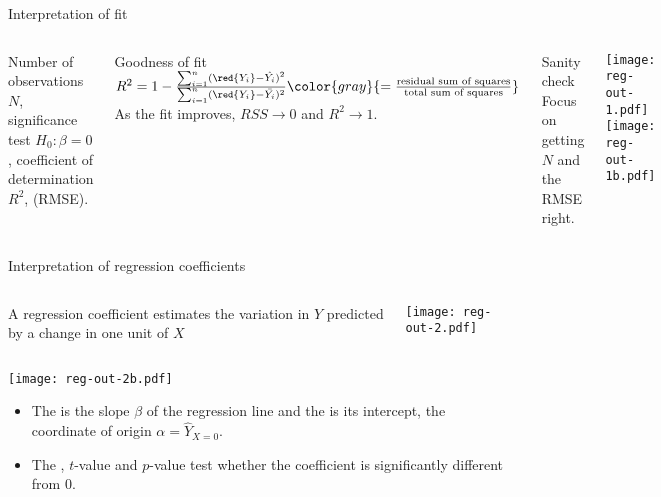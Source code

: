 \documentclass[t]{beamer}
\begin{document}
	\begin{frame}[t]{Interpretation of fit}

	\begin{columns}[T]


	Number of observations $N$, significance test $H_0: \beta = 0$, coefficient of determination $R^2$,  (RMSE).\\[1em]

	\begin{block}{Goodness of fit}\vspace{.5em}
		$R^2 = 1 - \frac{\sum ^n _{i=1}(\red{Y_i} - \hat{Y_i})^2}{\sum ^n _{i=1}(\red{Y_i} - \bar{Y_i})^2} \color{gray}{ = \frac{\text{residual sum of squares}}{\text{total sum of squares}}}$\\[1em]

		As the fit improves, $RSS \to 0$ and $R^2 \to 1$.
	\end{block}

	\begin{alertblock}{Sanity check}
		Focus on getting $N$ and the RMSE right.
	\end{alertblock}

		\texttt{[image: reg-out-1.pdf]}\vspace{1cm}
		\texttt{[image: reg-out-1b.pdf]}\vspace{1cm}
	\end{columns}

	\end{frame}

	\begin{frame}[t]{Interpretation of regression coefficients}

	\begin{columns}[T]

	\column{.65\textwidth}	

	A regression coefficient estimates the variation in $Y$ predicted by a change in one unit of $X$ \color{gray}{(recall that $Y = \alpha + \beta X + \epsilon$)}

	\column{.3\textwidth}
		\texttt{[image: reg-out-2.pdf]}\vspace{1cm}
	\end{columns}

	\vspace{-1em}
	\texttt{[image: reg-out-2b.pdf]}%

	\begin{itemize}
		\item The  is the slope $\beta$ of the regression line and the  is its intercept, the coordinate of origin $\alpha = \hat{Y}_{X=0}$.

		\item The , $t$-value and $p$-value test whether the coefficient is significantly different from $0$.
	\end{itemize}

	\end{frame}
\end{document}
